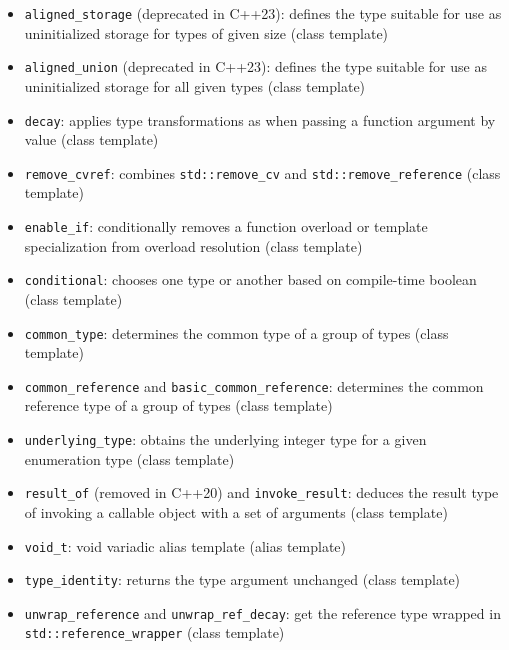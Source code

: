 \documentclass{report}
\begin{document}
        \begin{itemize}
            \item \texttt{aligned\_storage} (deprecated in C++23): defines the type suitable for use as uninitialized storage for types of given size (class template)
            \item \texttt{aligned\_union} (deprecated in C++23): defines the type suitable for use as uninitialized storage for all given types (class template)
            \item \texttt{decay}: applies type transformations as when passing a function argument by value (class template)
            \item \texttt{remove\_cvref}: combines \texttt{std::remove\_cv} and \texttt{std::remove\_reference} (class template)
            \item \texttt{enable\_if}: conditionally removes a function overload or template specialization from overload resolution (class template)
            \item \texttt{conditional}: chooses one type or another based on compile-time boolean (class template)
            \item \texttt{common\_type}: determines the common type of a group of types (class template)
            \item \texttt{common\_reference} and \texttt{basic\_common\_reference}: determines the common reference type of a group of types (class template)
            \item \texttt{underlying\_type}: obtains the underlying integer type for a given enumeration type (class template)
            \item \texttt{result\_of} (removed in C++20) and \texttt{invoke\_result}: deduces the result type of invoking a callable object with a set of arguments (class template)
            \item \texttt{void\_t}: void variadic alias template (alias template)
            \item \texttt{type\_identity}: returns the type argument unchanged (class template)
            \item \texttt{unwrap\_reference} and \texttt{unwrap\_ref\_decay}: get the reference type wrapped in \texttt{std::reference\_wrapper} (class template)
        \end{itemize}

        \pagebreak 
\end{document}

